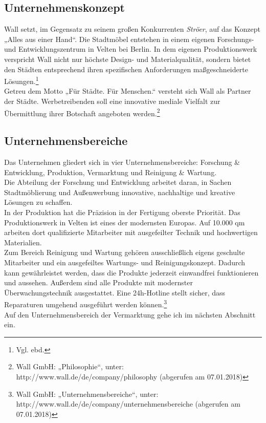 \subsection{Unternehmenskonzept}\label{sec:unternehmenskonzept}
Wall setzt, im Gegensatz zu seinem großen Konkurrenten \textit{Ströer}, auf das Konzept „Alles aus einer Hand“. Die Stadtmöbel entstehen in einem eigenen Forschungs- und Entwicklungszentrum in Velten bei Berlin. In dem eigenen Produktionswerk verspricht Wall nicht nur höchste Design- und Materialqualität, sondern bietet den Städten entsprechend ihren spezifischen Anforderungen maßgeschneiderte Lösungen.\footnote{\label{foot:5}Vgl. ebd.} \\ Getreu dem Motto „Für Städte. Für Menschen.“ versteht sich Wall als Partner der Städte. Werbetreibenden soll eine innovative mediale Vielfalt zur Übermittlung ihrer Botschaft angeboten werden.\footnote{\label{foot:6}Wall GmbH: „Philosophie“, unter: http://www.wall.de/de/company/philosophy (abgerufen am 07.01.2018)} 

\subsection{Unternehmensbereiche}\label{sec:unternehmensbereiche}
Das Unternehmen gliedert sich in vier Unternehmensbereiche: Forschung \& Entwicklung, Produktion, Vermarktung und Reinigung \& Wartung. \\ Die Abteilung der Forschung und Entwicklung arbeitet daran, in Sachen Stadtmöblierung und Außenwerbung innovative, nachhaltige und kreative Lösungen zu schaffen. \\ In der Produktion hat die Präzision in der Fertigung oberste Priorität. Das Produktionswerk in Velten ist eines der modernsten Europas. Auf 10.000 qm arbeiten dort qualifizierte Mitarbeiter mit ausgefeilter Technik und hochwertigen Materialien. \\ Zum Bereich Reinigung und Wartung gehören ausschließlich eigens geschulte Mitarbeiter und ein ausgefeiltes Wartungs- und Reinigungskonzept. Dadurch kann gewährleistet werden, dass die Produkte jederzeit einwandfrei funktionieren und aussehen. Außerdem sind alle Produkte mit modernster Überwachungstechnik ausgestattet. Eine 24h-Hotline stellt sicher, dass Reparaturen umgehend ausgeführt werden können.\footnote{\label{foot:7}Wall GmbH: „Unternehmensbereiche“, unter: http://www.wall.de/de/company/unternehmensbereiche (abgerufen am 07.01.2018)} \\ Auf den Unternehmensbereich der Vermarktung gehe ich im nächsten Abschnitt ein. 

